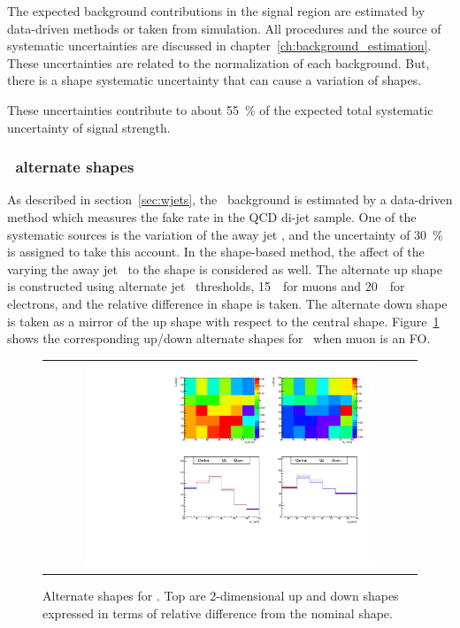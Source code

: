 The expected background contributions in the signal region are estimated by 
data-driven methods or taken from simulation.  
All procedures and the source of systematic uncertainties are discussed 
in chapter~\ref{ch:background_estimation}. These uncertainties are related 
to the normalization of each background. But, there is a shape systematic 
uncertainty that can cause a variation of shapes. 

These uncertainties contribute to about 55~\% of 
the expected total systematic uncertainty of signal strength. 


\subsubsection{\Wjets\ alternate shapes} 

As described in section~\ref{sec:wjets}, the \Wjets\ background is estimated 
by a data-driven method which measures the fake rate in the QCD di-jet sample. 
One of the systematic sources is the variation of the away jet \pt,
and the uncertainty of 30~\% is assigned to take this account. 
In the shape-based method, the affect of the varying the away jet \pt\ 
to the shape is considered as well. 
The alternate up shape is constructed using alternate jet \pt\ thresholds, 
15~\GeV\ for muons and 20~\GeV\ for electrons, and the relative difference 
in shape is taken. The alternate down shape is taken as a mirror of 
the up shape with respect to the central shape. 
Figure~\ref{fig:alter_wjets} shows the corresponding up/down alternate shapes
for \Wjets\ when muon is an FO. 
%
\begin{figure}[htp]
\centering
\begin{tabular}{c}
\includegraphics[width=0.8\textwidth]{figures/histo_WjetsM_CMS_hww_MVAWMBounding_0j_zoom.pdf}
\end{tabular}
\caption{Alternate shapes for \WjetsM. 
         Top are 2-dimensional up and down shapes expressed in terms of relative 
         difference from the nominal shape.}
\label{fig:alter_wjets}
\end{figure}


